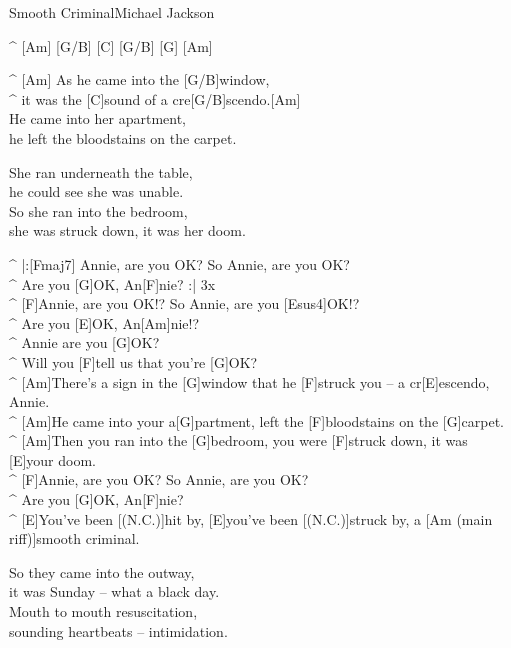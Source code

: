 \begin{song}{Smooth Criminal}{Michael Jackson}

\begin{guitar}
^ [Am] [G/B] [C] [G/B] [G] [Am]\\

\end{guitar}
\begin{guitar}
^ [Am]  As he came into the [G/B]window,\\
^ it was the [C]sound of a cre[G/B]scendo.[Am]\\
He came into her apartment,\\
he left the bloodstains on the carpet.\\
\end{guitar}

\begin{guitar}
She ran underneath the table,\\
he could see she was unable.\\
So she ran into the bedroom,\\
she was struck down, it was her doom.\\
\end{guitar}

\begin{guitar}
^ |:[Fmaj7] Annie, are you OK? So Annie, are you OK?\\
^ Are you [G]OK, An[F]nie? :| 3x\\
^ [F]Annie, are you OK!? So Annie, are you [Esus4]OK!?\\
^ Are you [E]OK, An[Am]nie!?\\
^ Annie are you [G]OK?\\
^ Will you [F]tell us that you're [G]OK?\\
^ [Am]There's a sign in the [G]window that he [F]struck you – a cr[E]escendo, Annie.\\
^ [Am]He came into your a[G]partment, left the [F]bloodstains on the [G]carpet.\\
^ [Am]Then you ran into the [G]bedroom, you were [F]struck down, it was [E]your doom.\\
^ [F]Annie, are you OK? So Annie, are you OK?\\
^ Are you [G]OK, An[F]nie?\\
^ [E]You've been [(N.C.)]hit by, [E]you've been [(N.C.)]struck by, a [Am (main riff)]smooth criminal.\\
\end{guitar}

\begin{guitar}
So they came into the outway,\\
it was Sunday – what a black day.\\
Mouth to mouth resuscitation,\\
sounding heartbeats – intimidation.\\
\end{guitar}


\end{song}
